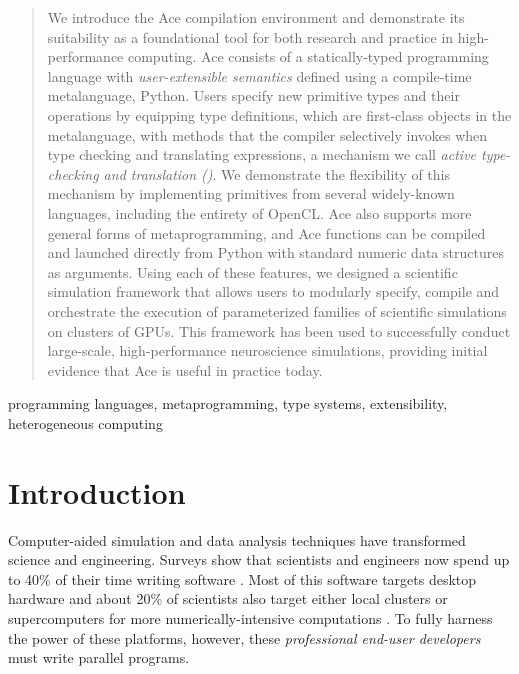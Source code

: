 \documentclass[10pt, conference, compsocconf]{IEEEtran}
\begin{document}
\begin{abstract}
We introduce the Ace compilation environment and demonstrate its suitability as a foundational tool for both research and practice in high-performance computing.
Ace consists of a statically-typed programming language with {\em user-extensible semantics} defined using a compile-time meta\-language, Python. Users specify new primitive types and their operations by equipping type definitions, which are first-class objects in the metalanguage, with  methods that the compiler selectively invokes when type checking and translating expressions, a mechanism we call {\em active type-checking and translation (\ATT)}. We demonstrate the flexibility of this mechanism by implementing primitives from several widely-known languages, including the entirety of OpenCL. Ace also supports more general forms of metaprogramming, and Ace functions can be compiled and launched directly from Python with standard numeric data structures as arguments. Using each of these features, we designed a scientific simulation framework that allows users to modularly specify, compile and orchestrate the execution of parameterized families of scientific simulations on clusters of GPUs. This framework has been used to successfully conduct large-scale, high-performance neuroscience simulations, providing initial evidence that Ace is useful in practice today.
\end{abstract}

\begin{IEEEkeywords}
programming languages, metaprogramming, type systems, extensibility, heterogeneous computing
\end{IEEEkeywords}


%
\IEEEpeerreviewmaketitle



\section{Introduction}

Computer-aided simulation and data analysis techniques have transformed science and engineering. Surveys show that scientists and engineers now spend up to 40\% of their time writing software \cite{howison2011scientific, hannay2009scientists}. Most of this software targets desktop hardware and about 20\% of scientists also target either local clusters or super\-computers for more numerically-intensive computations \cite{hannay2009scientists}. To fully harness the power of these platforms, however, these {\em professional end-user developers} \cite{segal2007some} must write parallel programs.
\end{document}
